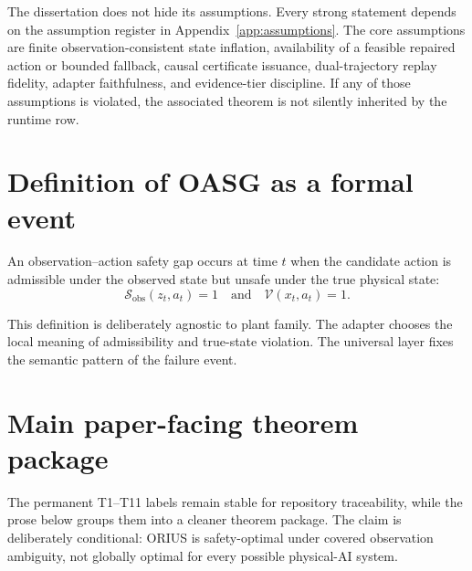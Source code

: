 The dissertation does not hide its assumptions. Every strong statement depends on the
assumption register in Appendix~\ref{app:assumptions}. The core assumptions are finite
observation-consistent state inflation, availability of a feasible repaired action or
bounded fallback, causal certificate issuance, dual-trajectory replay fidelity, adapter
faithfulness, and evidence-tier discipline. If any of those assumptions is violated, the
associated theorem is not silently inherited by the runtime row.

\section{Definition of OASG as a formal event}
\begin{definition}
An observation--action safety gap occurs at time $t$ when the candidate action is admissible
under the observed state but unsafe under the true physical state:
\[
\mathcal{S}_{\mathrm{obs}}(z_t, a_t)=1 \quad \text{and} \quad \mathcal{V}(x_t, a_t)=1.
\]
\end{definition}

This definition is deliberately agnostic to plant family. The adapter chooses the local
meaning of admissibility and true-state violation. The universal layer fixes the semantic
pattern of the failure event.

\section{Main paper-facing theorem package}
The permanent T1--T11 labels remain stable for repository traceability, while
the prose below groups them into a cleaner theorem package. The claim is
deliberately conditional: ORIUS is safety-optimal under covered observation
ambiguity, not globally optimal for every possible physical-AI system.


